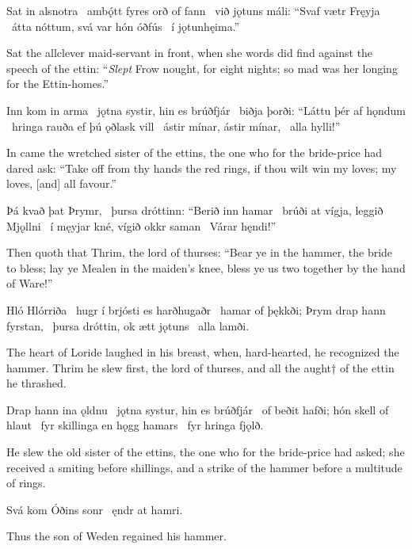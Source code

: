 Sat in alsnotra \hld\ ambǫ́tt fyr\footnotemark[1]
es orð of fann \hld\ við jǫtuns máli:
“Svaf vætr Fręyja \hld\ átta nóttum,
svá var hón óðfús \hld\ í jǫtunhęima.”

Sat the allclever maid-servant in front, when she words did find against the speech of the ettin: “\emph{Slept} Frow nought, for eight nights; so mad was her longing for the Ettin-homes.”

Inn kom in arma \hld\ jǫtna systir,
hin es brúðfjár \hld\ biðja þorði:
“Láttu þér af hǫndum \hld\ hringa rauða
ef þú ǫðlask vill \hld\ ástir mínar,
ástir mínar, \hld\ alla hylli!”

In came the wretched sister of the ettins, the one who for the bride-price had dared ask: “Take off from thy hands the red rings, if thou wilt win my loves; my loves, [and] all favour.”\footnotemark[1]

Þá kvað þat Þrymr, \hld\ þursa dróttinn:
“Berið inn hamar \hld\ brúði at vígja,
leggið Mjǫllni \hld\ í męyjar kné,
vígið okkr saman \hld\ Várar hęndi!”

Then quoth that Thrim, the lord of thurses: “Bear ye in the hammer, the bride to bless; lay ye Mealen in the maiden’s knee, bless ye us two together by the hand of Ware\footnotemark[1]!”

Hló Hlórriða \hld\ hugr í brjósti
es harðhugaðr \hld\ hamar of þękkði;
Þrym drap hann fyrstan, \hld\ þursa dróttin,
ok ætt jǫtuns \hld\ alla lamði.

The heart of Loride laughed in his breast, when, hard-hearted, he recognized the hammer. Thrim he slew first, the lord of thurses, and all the aught† of the ettin he thrashed.

Drap hann ina ǫldnu \hld\ jǫtna systur,
hin es brúðfjár \hld\ of beðit hafði;
hón skell of hlaut \hld\ fyr skillinga
en hǫgg hamars \hld\ fyr hringa fjǫlð.

He slew the old sister of the ettins, the one who for the bride-price had asked; she received a smiting before shillings, and a strike of the hammer before a multitude of rings.

Svá kom Óðins sonr \hld\ ęndr at hamri.

Thus the son of Weden regained his hammer.
